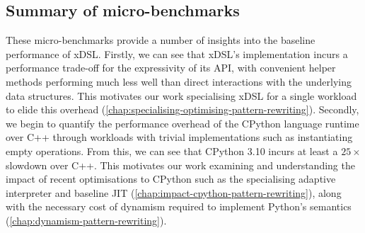 





\subsection{Summary of micro-benchmarks}
\label{ssec:ubenchmark-summary}

These micro-benchmarks provide a number of insights into the baseline performance of xDSL.
Firstly, we can see that xDSL's implementation incurs a performance trade-off for the expressivity of its API, with convenient helper methods performing much less well than direct interactions with the underlying data structures. This motivates our work specialising xDSL for a single workload to elide this overhead (\autoref{chap:specialising-optimising-pattern-rewriting}).
Secondly, we begin to quantify the performance overhead of the CPython language runtime over C++ through workloads with trivial implementations such as instantiating empty operations. From this, we can see that CPython 3.10 incurs at least a $25\times$ slowdown over C++.
This motivates our work examining and understanding the impact of recent optimisations to CPython such as the specialising adaptive interpreter and baseline JIT (\autoref{chap:impact-cpython-pattern-rewriting}), along with the necessary cost of dynamism required to implement Python's semantics (\autoref{chap:dynamism-pattern-rewriting}).


